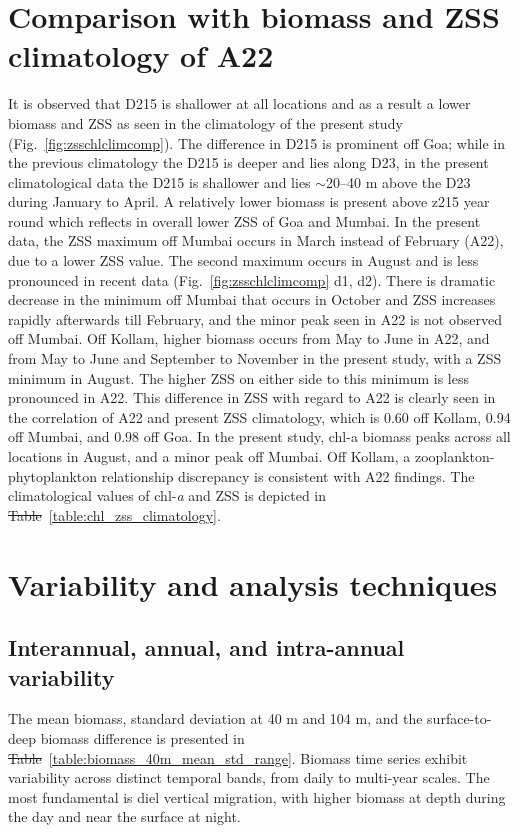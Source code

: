 \documentclass[12pt,a4paper]{article}
\providecommand{\DIFaddtex}[1]{{\protect\color{blue}\uwave{#1}}} %
\providecommand{\DIFdeltex}[1]{{\protect\color{red}\sout{#1}}}                      %
\providecommand{\DIFaddbegin}{} %
\providecommand{\DIFaddend}{} %
\providecommand{\DIFdelbegin}{} %
\providecommand{\DIFdelend}{} %
\providecommand{\DIFadd}[1]{\texorpdfstring{\DIFaddtex{#1}}{#1}} %
\providecommand{\DIFdel}[1]{\texorpdfstring{\DIFdeltex{#1}}{}} %
\newcommand{\DIFscaledelfig}{0.5}
\newlength{\DIFdelgraphicswidth} %
\newlength{\DIFdelgraphicsheight} %
\newcommand{\DIFaddincludegraphics}[2][]{{\color{blue}\fbox{\DIFOincludegraphics[#1]{#2}}}} %
\newcommand{\DIFdelincludegraphics}[2][]{%
\sbox{\DIFdelgraphicsbox}{\DIFOincludegraphics[#1]{#2}}%
\settoboxwidth{\DIFdelgraphicswidth}{\DIFdelgraphicsbox} %
\settoboxtotalheight{\DIFdelgraphicsheight}{\DIFdelgraphicsbox} %
\scalebox{\DIFscaledelfig}{%
\parbox[b]{\DIFdelgraphicswidth}{\usebox{\DIFdelgraphicsbox}\\[-\baselineskip] \rule{\DIFdelgraphicswidth}{0em}}\llap{\resizebox{\DIFdelgraphicswidth}{\DIFdelgraphicsheight}{%
\setlength{\unitlength}{\DIFdelgraphicswidth}%
\begin{picture}(1,1)%
\thicklines\linethickness{2pt} %
{\color[rgb]{1,0,0}\put(0,0){\framebox(1,1){}}}%
{\color[rgb]{1,0,0}\put(0,0){\line( 1,1){1}}}%
{\color[rgb]{1,0,0}\put(0,1){\line(1,-1){1}}}%
\end{picture}%
}\hspace*{3pt}}} %
} %
\DeclareRobustCommand{\DIFaddbegin}{\DIFOaddbegin \let\includegraphics\DIFaddincludegraphics} %
\DeclareRobustCommand{\DIFaddend}{\DIFOaddend \let\includegraphics\DIFOincludegraphics} %
\DeclareRobustCommand{\DIFdelbegin}{\DIFOdelbegin \let\includegraphics\DIFdelincludegraphics} %
\DeclareRobustCommand{\DIFdelend}{\DIFOaddend \let\includegraphics\DIFOincludegraphics} %
\begin{document}
\section{Comparison with biomass and ZSS climatology of A22}	
\label{sec:comparison} 	
It is observed that D215 is shallower at all locations and as a result a lower biomass and ZSS as seen in the climatology of the present study (Fig.~\ref{fig:zsschlclimcomp}). The difference in D215 is prominent off Goa; while in the previous climatology  the D215 is deeper and lies along D23, in the present climatological data the D215 is shallower and lies $\sim$20--40 m above the D23 during January to April. A relatively lower biomass is present above z215 year round which reflects in overall lower ZSS of Goa and Mumbai. In the present data, the ZSS maximum off Mumbai occurs in March instead of February (A22), due to a lower ZSS value. The second maximum occurs in August and is less pronounced in recent data (Fig.~\ref{fig:zsschlclimcomp} d1, d2). There is dramatic decrease in the minimum off Mumbai that occurs in October and ZSS increases rapidly afterwards till February, and the minor peak seen in A22 is not observed off Mumbai. Off Kollam, higher biomass occurs from May to June in A22, and from May to June and September to November in the present study, with a ZSS minimum in August. The higher ZSS on either side to this minimum is less pronounced in A22. This difference in ZSS with regard to A22 is clearly seen in the correlation of A22 and present ZSS climatology, which is 0.60 off Kollam, 0.94 off Mumbai, and 0.98 off Goa. In the present study, chl-a biomass peaks across all locations in August, and a minor peak off Mumbai. Off Kollam, a zooplankton-phytoplankton relationship discrepancy is consistent with A22 findings. The climatological values of chl-\textit{a} and ZSS is depicted in \DIFdelbegin \DIFdel{Table}\DIFdelend \DIFaddbegin \DIFadd{table}\DIFaddend ~\ref{table:chl_zss_climatology}.

\section{Variability and analysis techniques}
\label{sec:seasonlity_analysis}
\subsection{Interannual, annual, and intra-annual variability}
\label{sec:seasonal_cycle}

The mean biomass, standard deviation at 40 m and 104 m, and the surface-to-deep biomass difference is presented in \DIFdelbegin \DIFdel{Table}\DIFdelend \DIFaddbegin \DIFadd{table}\DIFaddend ~\ref{table:biomass_40m_mean_std_range}. Biomass time series exhibit variability across distinct temporal bands, from daily to multi-year scales. The most fundamental is diel vertical migration, with higher biomass at depth during the day and near the surface at night. 
\end{document}
